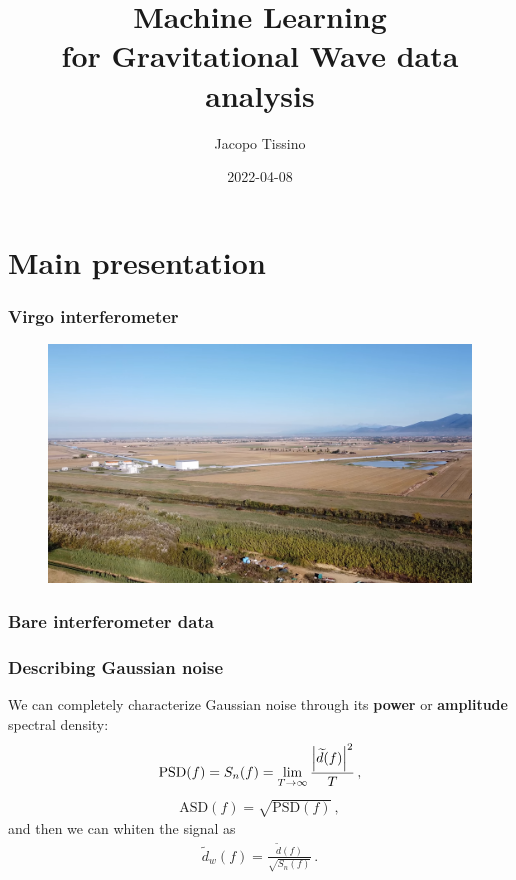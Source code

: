 \documentclass{beamer}
\title{Machine Learning \\ for Gravitational Wave data analysis}
\author{Jacopo Tissino}
\date{2022-04-08}
\begin{document}
\section{Main presentation}
\frame{\titlepage}

\begin{frame}
    \frametitle{Virgo interferometer}
    \begin{figure}[ht]
        \centering
        \includegraphics[width=\textwidth]{figures/Virgo}
        \label{fig:Virgo}
    \end{figure}
\end{frame}

\begin{frame}
    \frametitle{Bare interferometer data}
    \begin{figure}[ht]
    \label{fig:bare}
    \end{figure}
\end{frame}

\begin{frame}
    \frametitle{Describing Gaussian noise}
    We can completely characterize Gaussian noise through its \textbf{power} or \textbf{amplitude}
    spectral density:
    \begin{align}
    \text{PSD}(f) = S_n (f) = \lim _{T \to \infty} \frac{\abs{\widetilde{d}(f)}^2}{T} 
    \,,
    \end{align}
    \begin{align}
    \text{ASD} (f) = \sqrt{\text{PSD}(f)}
    \,,
    \end{align}
    and then we can whiten the signal as %
    \begin{align}
    \widetilde{d}_w (f) = \frac{\widetilde{d}(f)}{\sqrt{S_n(f)}}
    \,.
    \end{align}
\end{frame}
\end{document}
